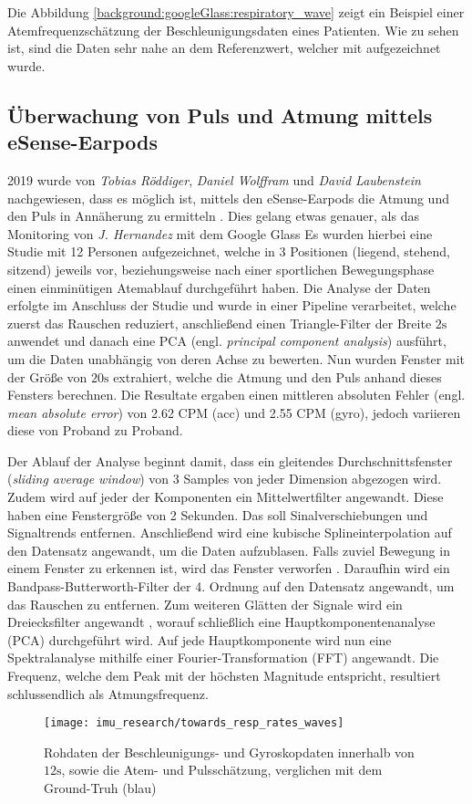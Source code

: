 Die Abbildung \ref{background:googleGlass:respiratory_wave} zeigt ein Beispiel einer Atemfrequenzschätzung der Beschleunigungsdaten eines Patienten. Wie zu sehen ist, sind die Daten sehr nahe an dem Referenzwert, welcher mit aufgezeichnet wurde.


\subsection{Überwachung von Puls und Atmung mittels eSense-Earpods}
2019 wurde von \textit{Tobias Röddiger}, \textit{Daniel Wolffram} und \textit{David Laubenstein} nachgewiesen, dass es möglich ist, mittels den eSense-Earpods die Atmung und den Puls in Annäherung zu ermitteln \cite{roddigerRespirationRateMonitoring2019}. 
Dies gelang etwas genauer, als das Monitoring von \textit{J. Hernandez} mit dem Google Glass \cite{hernandezCardiacRespiratoryParameter}
Es wurden hierbei eine Studie mit 12 Personen aufgezeichnet, welche in 3 Positionen (liegend, stehend, sitzend) jeweils vor, beziehungsweise nach einer sportlichen Bewegungsphase einen einminütigen Atemablauf durchgeführt haben. 
Die Analyse der Daten erfolgte im Anschluss der Studie und wurde in einer Pipeline verarbeitet, welche zuerst das Rauschen reduziert, anschließend einen Triangle-Filter der Breite $2\si{\s}$ anwendet und danach eine PCA (engl. \textit{principal component analysis}) ausführt, um die Daten unabhängig von deren Achse zu bewerten.
Nun wurden Fenster mit der Größe von $20\si{\s}$ extrahiert, welche die Atmung und den Puls anhand dieses Fensters berechnen.
Die Resultate ergaben einen mittleren absoluten Fehler (engl. \textit{mean absolute error}) von 2.62 CPM (acc) und 2.55 CPM (gyro), jedoch variieren diese von Proband zu Proband.

Der Ablauf der Analyse beginnt damit, dass ein gleitendes Durchschnittsfenster (\textit{sliding average window}) von 3 Samples von jeder Dimension abgezogen wird. 
Zudem wird auf jeder der Komponenten ein Mittelwertfilter angewandt. 
Diese haben eine Fenstergröße von 2 Sekunden. 
Das soll Sinalverschiebungen und Signaltrends entfernen.
Anschließend wird eine kubische Splineinterpolation auf den Datensatz angewandt, um die Daten aufzublasen.
Falls zuviel Bewegung in einem Fenster zu erkennen ist, wird das Fenster verworfen \cite{sunSleepMonitorMonitoringRespiratory2017}.
Daraufhin wird ein Bandpass-Butterworth-Filter der 4. Ordnung auf den Datensatz angewandt, um das Rauschen zu entfernen.
Zum weiteren Glätten der Signale wird ein Dreiecksfilter angewandt \cite{haotianMindfulWatch2017}, worauf schließlich eine Hauptkomponentenanalyse (PCA) durchgeführt wird.
Auf jede Hauptkomponente wird nun eine Spektralanalyse mithilfe einer Fourier-Transformation (FFT) angewandt. 
Die Frequenz, welche dem Peak mit der höchsten Magnitude entspricht, resultiert schlussendlich als Atmungsfrequenz.

\begin{figure}[ht]
    \texttt{[image: imu\_research/towards\_resp\_rates\_waves]}
    \caption{Rohdaten der Beschleunigungs- und Gyroskopdaten innerhalb von $12 \si{\s}$, sowie die Atem- und Pulsschätzung, verglichen mit dem Ground-Truh (blau)}
    \label{background:towards_resp_esense:results}
\end{figure}
